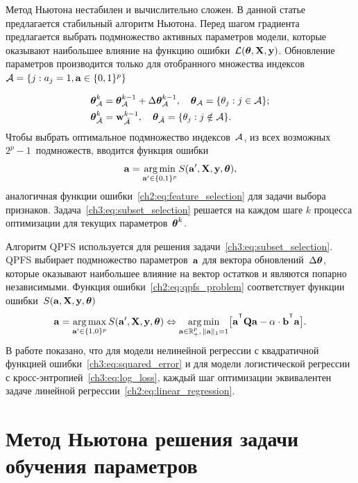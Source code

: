 Метод Ньютона нестабилен и вычислительно сложен. 
В данной статье предлагается стабильный алгоритм Ньютона. 
Перед шагом градиента предлагается выбрать подмножество активных параметров модели, которые оказывают наибольшее влияние на функцию ошибки~$\mathcal{L} (\boldsymbol{\theta}, \mathbf{X}, \mathbf{y})$.
Обновление параметров производится только для отобранного множества индексов~$\mathcal{A} = \{j: a_j = 1, \mathbf{a} \in \{0, 1\}^p\}$

\begin{align*}
\boldsymbol{\theta}_{\mathcal{A}}^k &= \boldsymbol{\theta}_{\mathcal{A}}^{k - 1} + \Delta \boldsymbol{\theta}_{\mathcal{A}}^{k - 1}, \quad \boldsymbol{\theta}_{\mathcal{A}} = \{\theta_j: j \in \mathcal{A} \}; \\
\boldsymbol{\theta}_{\bar{\mathcal{A}}}^k &= \mathbf{w}_{\bar{\mathcal{A}}}^{k - 1}, \quad \boldsymbol{\theta}_{\bar{\mathcal{A}}} = \{\theta_j: j \notin \mathcal{A} \}.
\end{align*}
Чтобы выбрать оптимальное подмножество индексов~$\mathcal{A}$, из всех возможных $2^p - 1$~подмножеств, вводится функция ошибки
\begin{equation}
\mathbf{a} = \mathop{\arg \min}\limits_{\mathbf{a}' \in \{0, 1\}^p} S(\mathbf{a}', \mathbf{X}, \mathbf{y}, \boldsymbol{\theta}),
\label{ch3:eq:subset_selection}
\end{equation}
аналогичная функции ошибки~\eqref{ch2:eq:feature_selection} для задачи выбора признаков. 
Задача~\eqref{ch3:eq:subset_selection} решается на каждом шаге $k$ процесса оптимизации для текущих параметров~$\boldsymbol{\theta}^k$.

Алгоритм QPFS используется для решения задачи~\eqref{ch3:eq:subset_selection}.
QPFS выбирает подмножество параметров~$\mathbf{a}$ для вектора обновлений~$ \Delta \boldsymbol{\theta}$, которые оказывают наибольшее влияние на вектор остатков и являются попарно независимыми.
Функция ошибки~\eqref{ch2:eq:qpfs_problem} соответствует функции ошибки~$S(\mathbf{a}, \mathbf{X}, \mathbf{y}, \boldsymbol{\theta})$
\begin{equation}
\ba = \argmax_{\ba' \in \{1, 0\}^p} S(\ba', \bX, \by, \btheta) \Leftrightarrow \argmin_{\ba  \in \bbR^p_+, \, \|\ba\|_1=1} \bigl[\ba^{\T} \bQ \ba - \alpha \cdot \mathbf{b}^{\T} \ba \bigr].
\end{equation}
В работе показано, что для модели нелинейной регрессии с квадратичной функцией ошибки~\eqref{ch3:eq:squared_error} и для модели логистической регрессии с кросс-энтропией~\eqref{ch3:eq:log_loss}, каждый шаг оптимизации эквивалентен задаче линейной регрессии~\eqref{ch2:eq:linear_regression}.



\section{Метод Ньютона решения задачи обучения параметров}

